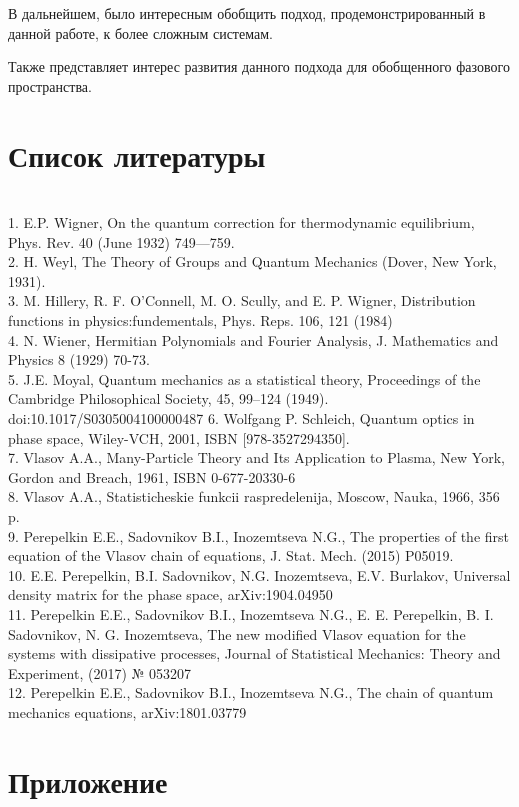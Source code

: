 \documentclass[a4paper,14pt]{article}
\begin{document}
В дальнейшем, было интересным обобщить подход, продемонстрированный в данной работе, к более сложным системам. 

Также представляет интерес развития данного подхода для обобщенного фазового пространства. 
\newpage
\section{Список литературы}
~\\
1. E.P. Wigner, On the quantum correction for thermodynamic equilibrium, Phys. Rev. 40 (June 1932) 749—759. \\
2. H. Weyl, The Theory of Groups and Quantum Mechanics (Dover, New York, 1931). \\
3. M. Hillery, R. F. O'Connell, M. O. Scully, and E. P. Wigner, Distribution functions in physics:fundementals, Phys. Reps. 106, 121 (1984)\\
4. N. Wiener, Hermitian Polynomials and Fourier Analysis, J. Mathematics and Physics 8 (1929) 70-73.\\
5. J.E. Moyal, Quantum mechanics as a statistical theory, Proceedings of the Cambridge Philosophical Society, 45, 99–124 (1949). doi:10.1017/S0305004100000487
6. Wolfgang P. Schleich, Quantum optics in phase space, Wiley-VCH, 2001, ISBN [978-3527294350].\\
7. Vlasov A.A., Many-Particle Theory and Its Application to Plasma, New York, Gordon and Breach, 1961, ISBN 0-677-20330-6\\
8. Vlasov A.A., Statisticheskie funkcii raspredelenija, Moscow, Nauka, 1966, 356 p.\\
9. Perepelkin E.E., Sadovnikov B.I., Inozemtseva N.G., The properties of the first equation of the Vlasov chain of equations, J. Stat. Mech. (2015) P05019.\\
10. E.E. Perepelkin, B.I. Sadovnikov, N.G. Inozemtseva, E.V. Burlakov, Universal density matrix for the phase space, arXiv:1904.04950\\
11. Perepelkin E.E., Sadovnikov B.I., Inozemtseva N.G., E. E. Perepelkin, B. I. Sadovnikov, N. G. Inozemtseva, The new modified Vlasov equation for the systems with dissipative processes, Journal of Statistical Mechanics: Theory and Experiment, (2017) № 053207\\
12. Perepelkin E.E., Sadovnikov B.I., Inozemtseva N.G., The chain of quantum mechanics equations, arXiv:1801.03779

\newpage
\section{Приложение}
%
  
\end{document}
